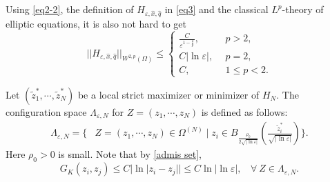 \documentclass[12pt,reqno]{amsart}
\numberwithin{equation}{section}
\theoremstyle{definition}
\theoremstyle{remark}
\begin{document}
Using \eqref{eq2-2}, the definition of $ H_{\varepsilon, \hat{x}, \hat{q}} $ in \eqref{eq3} and the classical $ L^p $-theory of elliptic equations, it is also not hard to get 
\begin{equation}\label{3-001}
||H_{\varepsilon, \hat{x}, \hat{q}}||_{W^{2,p}(\Omega)}\leq
\begin{cases}
\frac{C}{\varepsilon^{1-\frac{2}{p}}},\ \ &p>2,\\
C|\ln\varepsilon|,\ \ &p=2,\\
C,\ \ &1\leq p<2.
\end{cases}
\end{equation}


Let $ \left( \tilde{z}_1^*,\cdots, \tilde{z}_N^*\right)  $ be a local strict maximizer or minimizer of $ H_N $. The configuration space $ \Lambda_{\varepsilon, N} $ for $ Z=(z_1,\cdots,z_N) $ is defined as follows:%
\begin{equation}\label{admis set}
\begin{split}
\Lambda_{\varepsilon, N}=\bigg\{&Z=(z_1,\cdots, z_N)\in\Omega^{(N)}\mid z_i\in B_{\frac{\rho_0}{2\sqrt{|\ln\varepsilon|}}}\left ( \frac{\tilde{z}_i^*}{\sqrt{|\ln\varepsilon|}}\right )\bigg\}.%
\end{split}
\end{equation}
Here $ \rho_0>0 $ is small. Note that by \eqref{admis set},
\begin{equation}\label{3-003}
G_K(z_i,z_j)\leq C|\ln|z_i-z_j||\leq C\ln|\ln\varepsilon|,\ \ \ \ \forall\  Z\in \Lambda_{\varepsilon, N}.
\end{equation}
\end{document}

